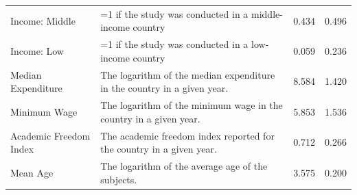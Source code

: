 \begin{singlespace}
\begin{scriptsize}
\begin{longtable}{
@{\hskip\tabcolsep\extracolsep\fill}
l
p{0.55\hsize}
cc
@{}
}
         Income: Middle &                                                                                                 =1 if the study was conducted in a middle-income country &    0.434 &  0.496 \\
            Income: Low &                                                                                                    =1 if the study was conducted in a low-income country &    0.059 &  0.236 \\
     Median Expenditure &                                                                                  The logarithm of the median expenditure in the country in a given year. &    8.584 &  1.420 \\
           Minimum Wage &                                                                                        The logarithm of the minimum wage in the country in a given year. &    5.853 &  1.536 \\
 Academic Freedom Index &                                                                                     The academic freedom index reported for the country in a given year. &    0.712 &  0.266 \\
               Mean Age &                                                                                                        The logarithm of the average age of the subjects. &    3.575 &  0.200 \\
    \midrule 
    

\end{longtable}
\end{scriptsize}
\end{singlespace}
